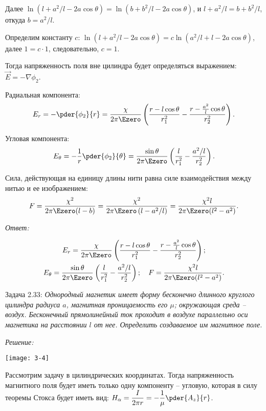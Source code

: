 Далее \( \ln\left( l + a^2/l - 2a\cos\theta\right) = \ln\left(b + b^2/l -
2a\cos\theta\right) \), и \( l + a^2/l = b + b^2/l \), откуда \( b = a^2/l \).

Определим константу \( c \): \( \ln\left( l + a^2/l - 2a\cos\theta \right) =
c\ln\left( a^2/l + l - 2a\cos\theta \right) \), далее \( 1  = c\cdot 1 \),
следовательно, \( c = 1 \).

Тогда напряженность поля вне цилиндра будет определяться выражением:
\( \vec{E} = -\nabla\phi_2 \).

Радиальная компонента:
\[
    E_r = -\pder{\phi_2}{r} = \frac{\chi}{2\pi\Ezero}
    \left( \frac{r - l\cos\theta}{r_1^2} - \frac{r - \frac{a^2}{l}\cos\theta}
    {r_2^2} \right).
\]

Угловая компонента:
\[
    E_\theta = -\frac{1}{r}\pder{\phi_2}{\theta} = \frac{\sin\theta}{2\pi\Ezero}
    \left( \frac{l}{r_1^2} - \frac{a^2/l}{r_2^2} \right).
\]

Сила, действующая на единицу длины нити равна силе взаимодействия между нитью и
ее изображением:
\[
   F = \frac{\chi^2}{2\pi\Ezero(l - b)} = \frac{\chi^2}{2\pi\Ezero\left( l -
   a^2/l \right)} = \frac{\chi^2l}{2\pi\Ezero(l^2-a^2)}.
\]

\vspace*{2em}
\emph{Ответ:}

\vspace*{-4.5em}
\begin{gather*}
    E_r = \frac{\chi}{2\pi\Ezero}\left( \frac{r - l\cos\theta}{r_1^2} -
    \frac{r - \frac{a^2}{l}\cos\theta}{r_2^2} \right); \\
    E_\theta = \frac{\sin\theta}{2\pi\Ezero}\left( \frac{l}{r_1^2} -
    \frac{a^2/l}{r_2^2} \right); \quad
    F = \frac{\chi^2l}{2\pi\Ezero(l^2-a^2)}.
\end{gather*}

\newpage
Задача 2.33: \emph{Однородный магнетик имеет форму бесконечно длинного
круглого цилиндра радиуса \( a \), магнитная проницаемость его \( \mu \);
окружающая среда -- воздух. Бесконечный прямолинейный ток проходит в воздухе
параллельно оси магнетика на расстоянии \( l \) от нее. Определить создаваемое
им магнитное поле.}

\vspace*{2em}
\emph{Решение:}

\begin{minipage}{.5\textwidth}
    \texttt{[image: 3-4]}
\end{minipage}
\begin{minipage}{.46\textwidth}
    Рассмотрим задачу в цилиндрических координатах. Тогда напряженность
    магнитного поля будет иметь только одну компоненту -- угловую, которая в
    силу теоремы Стокса будет иметь вид:
    \( \ds H_\alpha = \frac{I}{2\pi r} = -\frac{1}{\mu}\pder{A_z}{r} \).
\end{minipage}

